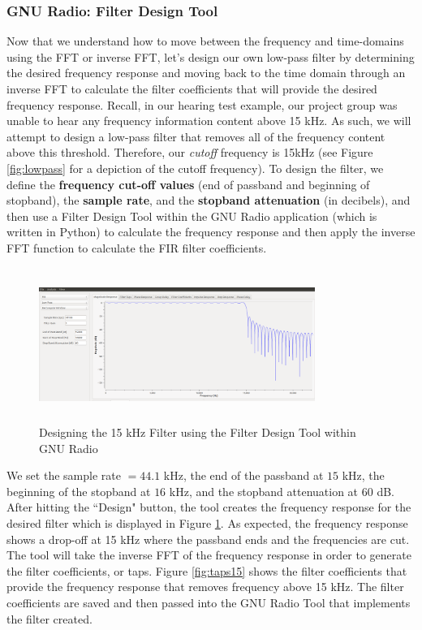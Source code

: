 \subsubsection{GNU Radio: Filter Design Tool}

Now that we understand how to move between the frequency and
time-domains using the FFT or inverse FFT, let's design our own
low-pass filter by determining the desired frequency response and
moving back to the time domain through an inverse FFT to
calculate the filter coefficients that will provide the desired
frequency response. Recall, in our hearing test example, our
project group was unable to hear any frequency information
content above 15 kHz. As such, we will attempt to design a
low-pass filter that removes all of the frequency content above
this threshold. Therefore, our \textit{cutoff} frequency is 15kHz
(see Figure \ref{fig:lowpass} for a depiction of the cutoff
frequency). To design the filter, we define the \textbf{frequency
cut-off values} (end of passband and beginning of stopband), the
\textbf{sample rate}, and the \textbf{stopband attenuation} (in
decibels), and then use a Filter Design Tool within the GNU Radio
application (which is written in Python) to calculate the frequency response and then apply the inverse FFT
function to calculate the FIR filter coefficients.  

\begin{figure}[h!]
	\centering
	\includegraphics[height = 5cm, width =9cm]{images/filter_tool_15kHz.png} %
	\caption{Designing the 15 kHz Filter using the Filter Design Tool within GNU Radio}
	\label{fig:mainfilt}
\end{figure}  

We set the sample rate $= 44.1$ kHz, the end of the passband at
$15$ kHz, the beginning of the stopband at $16$ kHz, and the
stopband attenuation at $60$ dB. After hitting the ``Design"
button, the tool creates the frequency response for the desired
filter which is displayed in Figure \ref{fig:mainfilt}. As
expected, the frequency response shows a drop-off at 15 kHz where
the passband ends and the frequencies are cut. The tool will take
the inverse FFT of the frequency response in order to generate
the filter coefficients, or taps. Figure \ref{fig:taps15} shows
the filter coefficients that provide the frequency response that
removes frequency above 15 kHz. The filter coefficients are saved
and then passed into the GNU Radio Tool that implements the
filter created.  


